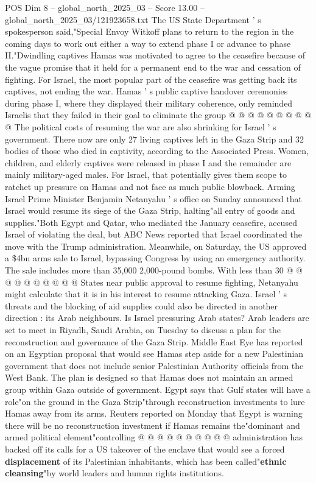 \begin{textsample}{POS Dim 8 – global\_north\_2025\_03 – Score 13.00 – global\_north\_2025\_03/121923658.txt}
The US State Department ' s spokesperson said,"Special Envoy Witkoff plans to return to the region in the coming days to work out either a way to extend phase I or advance to phase II."Dwindling captives Hamas was motivated to agree to the ceasefire because of the vague promise that it held for a permanent end to the war and cessation of fighting.
For Israel, the most popular part of the ceasefire was getting back its captives, not ending the war.
Hamas ' s public captive handover ceremonies during phase I, where they displayed their military coherence, only reminded Israelis that they failed in their goal to eliminate the group @ @ @ @ @ @ @ @ @ @ The political costs of resuming the war are also shrinking for Israel ' s government.
There now are only 27 living captives left in the Gaza Strip and 32 bodies of those who died in captivity, according to the Associated Press.
Women, children, and elderly captives were released in phase I and the remainder are mainly military-aged males.
For Israel, that potentially gives them scope to ratchet up pressure on Hamas and not face as much public blowback.
Arming Israel Prime Minister Benjamin Netanyahu ' s office on Sunday announced that Israel would resume its siege of the Gaza Strip, halting"all entry of goods and supplies."Both Egypt and Qatar, who mediated the January ceasefire, accused Israel of violating the deal, but ABC News reported that Israel coordinated the move with the Trump administration.
Meanwhile, on Saturday, the US approved a \$4bn arms sale to Israel, bypassing Congress by using an emergency authority.
The sale includes more than 35,000 2,000-pound bombs.
With less than 30 @ @ @ @ @ @ @ @ @ @ States near public approval to resume fighting, Netanyahu might calculate that it is in his interest to resume attacking Gaza.
Israel ' s threats and the blocking of aid supplies could also be directed in another direction : its Arab neighbours.
Is Israel pressuring Arab states?
Arab leaders are set to meet in Riyadh, Saudi Arabia, on Tuesday to discuss a plan for the reconstruction and governance of the Gaza Strip.
Middle East Eye has reported on an Egyptian proposal that would see Hamas step aside for a new Palestinian government that does not include senior Palestinian Authority officials from the West Bank.
The plan is designed so that Hamas does not maintain an armed group within Gaza outside of government.
Egypt says that Gulf states will have a role"on the ground in the Gaza Strip"through reconstruction investments to lure Hamas away from its arms.
Reuters reported on Monday that Egypt is warning there will be no reconstruction investment if Hamas remains the"dominant and armed political element"controlling @ @ @ @ @ @ @ @ @ @ administration has backed off its calls for a US takeover of the enclave that would see a forced \textbf{displacement} of its Palestinian inhabitants, which has been called"\textbf{ethnic} \textbf{cleansing}"by world leaders and human rights institutions.

\end{textsample}
